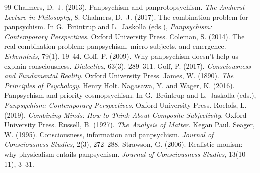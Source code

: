 \documentclass{situationist-preprint}
\begin{document}
\begin{thebibliography}{99}\small
{} Chalmers, D.~J. (2013). Panpsychism and panprotopsychism. \emph{The Amherst Lecture in Philosophy}, 8.
 Chalmers, D.~J. (2017). The combination problem for panpsychism. In G.~Br\"untrup and L.~Jaskolla (eds.), \emph{Panpsychism: Contemporary Perspectives}. Oxford University Press.
 Coleman, S. (2014). The real combination problem: panpsychism, micro-subjects, and emergence. \emph{Erkenntnis}, 79(1), 19--44.
 Goff, P. (2009). Why panpsychism doesn't help us explain consciousness. \emph{Dialectica}, 63(3), 289--311.
 Goff, P. (2017). \emph{Consciousness and Fundamental Reality}. Oxford University Press.
 James, W. (1890). \emph{The Principles of Psychology}. Henry Holt.
 Nagasawa, Y. and Wager, K. (2016). Panpsychism and priority cosmopsychism. In G.~Br\"untrup and L.~Jaskolla (eds.), \emph{Panpsychism: Contemporary Perspectives}. Oxford University Press.
 Roelofs, L. (2019). \emph{Combining Minds: How to Think About Composite Subjectivity}. Oxford University Press.
 Russell, B. (1927). \emph{The Analysis of Matter}. Kegan Paul.
 Seager, W. (1995). Consciousness, information and panpsychism. \emph{Journal of Consciousness Studies}, 2(3), 272--288.
 Strawson, G. (2006). Realistic monism: why physicalism entails panpsychism. \emph{Journal of Consciousness Studies}, 13(10--11), 3--31.
\end{thebibliography}
\end{document}
